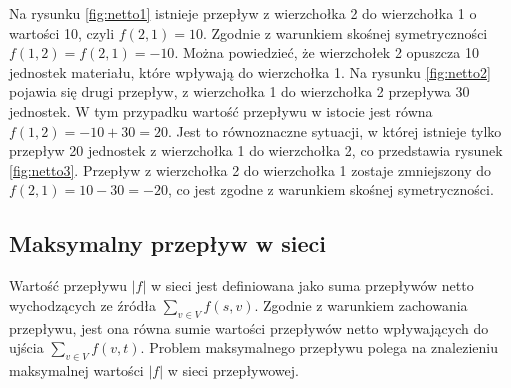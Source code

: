 Na rysunku \ref{fig:netto1} istnieje przepływ z wierzchołka 2 do wierzchołka 1 o wartości 10, czyli $ f(2, 1) = 10 $. Zgodnie z warunkiem skośnej symetryczności $ f(1, 2) = f(2, 1) = -10 $. Można powiedzieć, że wierzchołek 2 opuszcza 10 jednostek materiału, które wpływają do wierzchołka 1. Na rysunku \ref{fig:netto2} pojawia się drugi przepływ, z wierzchołka 1 do wierzchołka 2 przepływa 30 jednostek. W tym przypadku wartość przepływu w istocie jest równa $ f(1,2)=-10 + 30=20 $. Jest to równoznaczne sytuacji, w której istnieje tylko przepływ 20 jednostek z wierzchołka 1 do wierzchołka 2, co przedstawia rysunek \ref{fig:netto3}. Przepływ z wierzchołka 2 do wierzchołka 1 zostaje zmniejszony do $ f(2, 1)=10-30=-20 $, co jest zgodne z warunkiem skośnej symetryczności.\cite{id:ZaawansowaneAlgorytmy}
\subsection{Maksymalny przepływ w sieci}
Wartość przepływu $ |f| $ w sieci jest definiowana jako suma przepływów netto wychodzących ze źródła $ \sum_{v\in V}{f(s, v)} $. Zgodnie z warunkiem zachowania przepływu, jest ona równa sumie wartości przepływów netto wpływających do ujścia $ \sum_{v\in V}{f(v, t)} $. Problem maksymalnego przepływu polega na znalezieniu maksymalnej wartości $ |f| $ w sieci przepływowej.\cite{id:ZaawansowaneAlgorytmy}
